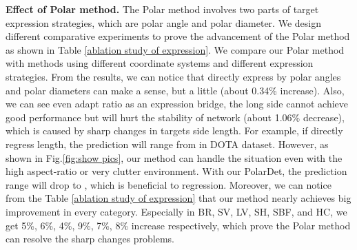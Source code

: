 \documentclass[10pt,twocolumn]{article}
\begin{document}
\begin{table}
	\centering
	\caption{Results and speed comparison on HRSC2016.}
	\label{HRSC2016 result}
\end{table}

\textbf{Effect of Polar method.} The Polar method involves two parts of target expression strategies, which are polar angle and polar diameter. We design different comparative experiments to prove the advancement of the Polar method as shown in Table \ref{ablation study of expression}. We compare our Polar method with methods using different coordinate systems and different expression strategies. From the results, we can notice that directly express by polar angles and polar diameters can make a sense, but a little (about 0.34\% increase). Also, we can see even adapt ratio as an expression bridge, the long side cannot achieve good performance but will hurt the stability of network (about 1.06\% decrease), which is caused by sharp changes in targets side length. For example, if directly regress length, the prediction will range from  in DOTA dataset. However, as shown in Fig.\ref{fig:show pics}, our method can handle the situation even with the high aspect-ratio or very clutter environment. With our PolarDet, the prediction range will drop to , which is beneficial to regression.  Moreover, we can notice from the Table \ref{ablation study of expression} that our method nearly achieves big improvement in every category. Especially in BR, SV, LV, SH, SBF, and HC, we get 5\%, 6\%, 4\%, 9\%, 7\%, 8\% increase respectively, which prove the Polar method can resolve the sharp changes problems.
\end{document}
